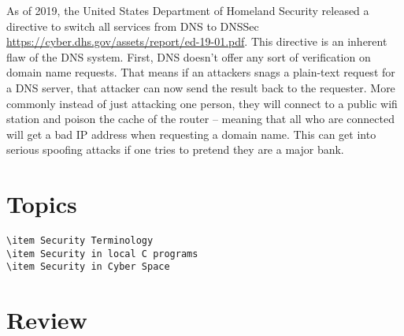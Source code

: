 As of 2019, the United States Department of Homeland Security released a directive to switch all services from DNS to DNSSec \url{https://cyber.dhs.gov/assets/report/ed-19-01.pdf}.
This directive is an inherent flaw of the DNS system.
First, DNS doesn't offer any sort of verification on domain name requests.
That means if an attackers snags a plain-text request for a DNS server, that attacker can now send the result back to the requester.
More commonly instead of just attacking one person, they will connect to a public wifi station and poison the cache of the router -- meaning that all who are connected will get a bad IP address when requesting a domain name.
This can get into serious spoofing attacks if one tries to pretend they are a major bank.

\section{Topics}

\begin{lstlisting}
\item Security Terminology
\item Security in local C programs
\item Security in Cyber Space
\end{lstlisting}

\section{Review}

